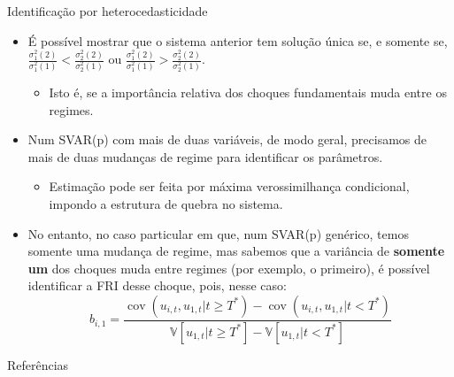 \documentclass[11pt]{beamer}
\begin{document}
\begin{frame}{Identificação por heterocedasticidade}
	\begin{itemize}
		\item É possível mostrar que o sistema anterior tem solução única se, e somente se, $\frac{\sigma^2_1(2)}{\sigma^2_1(1)} < \frac{\sigma^2_2(2)}{\sigma^2_2(1)}$ ou $\frac{\sigma^2_1(2)}{\sigma^2_1(1)} > \frac{\sigma^2_2(2)}{\sigma^2_2(1)}$.
		\begin{itemize}
			\item Isto é, se a importância relativa dos choques fundamentais muda entre os regimes.
		\end{itemize}
		\item Num SVAR(p) com mais de duas variáveis, de modo geral, precisamos de mais de duas mudanças de regime para identificar os parâmetros.
		\begin{itemize}
			\item Estimação pode ser feita por máxima verossimilhança condicional, impondo a estrutura de quebra no sistema.
		\end{itemize}
		\item No entanto, no caso particular em que, num SVAR(p) genérico, temos somente uma mudança de regime, {\color{blue}mas sabemos que a variância de \textbf{somente um} dos choques muda entre regimes} (por exemplo, o primeiro), é possível identificar a FRI desse choque, pois, nesse caso:
		$$b_{i,1} = \frac{\operatorname{cov}(u_{i,t}, u_{1,t}|t\geq T^*)- \operatorname{cov}(u_{i,t}, u_{1,t}|t< T^*)}{\mathbb{V}[u_{1,t}|t\geq T^*]-\mathbb{V}[u_{1,t}|t< T^*]}$$
	\end{itemize}
\end{frame}

\appendix
\begin{frame}[allowframebreaks]{Referências}
	\printbibliography
\end{frame}
\end{document}
